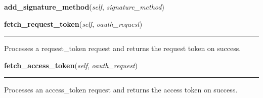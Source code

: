     \label{lib:oauth:OAuthServer:add_signature_method}

    \vspace{0.5ex}

\hspace{.8\funcindent}\begin{boxedminipage}{\funcwidth}

    \raggedright \textbf{add\_signature\_method}(\textit{self}, \textit{signature\_method})

\setlength{\parskip}{2ex}
\setlength{\parskip}{1ex}
    \end{boxedminipage}

    \label{lib:oauth:OAuthServer:fetch_request_token}

    \vspace{0.5ex}

\hspace{.8\funcindent}\begin{boxedminipage}{\funcwidth}

    \raggedright \textbf{fetch\_request\_token}(\textit{self}, \textit{oauth\_request})

    \vspace{-1.5ex}

    \rule{\textwidth}{0.5\fboxrule}
\setlength{\parskip}{2ex}
    Processes a request\_token request and returns the request token on 
    success.

\setlength{\parskip}{1ex}
    \end{boxedminipage}

    \label{lib:oauth:OAuthServer:fetch_access_token}

    \vspace{0.5ex}

\hspace{.8\funcindent}\begin{boxedminipage}{\funcwidth}

    \raggedright \textbf{fetch\_access\_token}(\textit{self}, \textit{oauth\_request})

    \vspace{-1.5ex}

    \rule{\textwidth}{0.5\fboxrule}
\setlength{\parskip}{2ex}
    Processes an access\_token request and returns the access token on 
    success.

\setlength{\parskip}{1ex}
    \end{boxedminipage}

